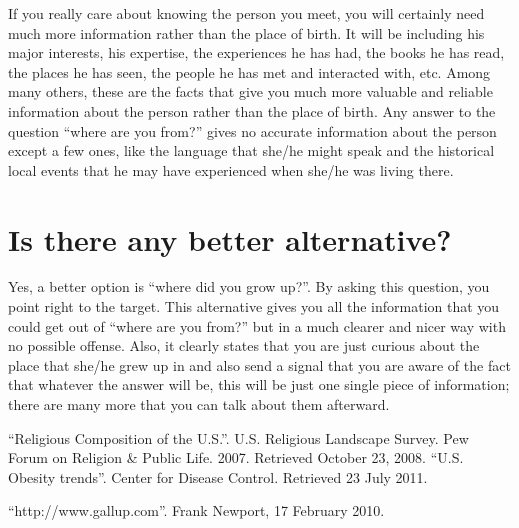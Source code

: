 \documentclass[DIV=calc, paper=a4, fontsize=11pt, twocolumn]{scrartcl}	 %
\begin{document}
If you really care about knowing the person you meet, you will certainly need much more information rather than the place of birth. It will be including his major interests, his expertise, the experiences he has had, the books he has read, the places he has seen, the people he has met and interacted with, etc. Among many others, these are the facts that give you much more valuable and reliable information about the person rather than the place of birth. Any answer to the question ``where are you from?'' gives no accurate information about the person except a few ones, like the language that she/he might speak and the historical local events that he may have experienced when she/he was living there. 



\section*{Is there any better alternative?}
Yes, a better option is ``where did you grow up?''. By asking this question, you point right to the target. This alternative gives you all the information that you could get out of ``where are you from?'' but in a much clearer and nicer way with no possible offense. Also, it clearly states that you are just curious about the place that she/he grew up in and also send a signal that you are aware of the fact that whatever the answer will be, this will be just one single piece of information; there are many more that you can talk about them afterward. 


\begin{thebibliography}{99} %

 ``Religious Composition of the U.S.''. U.S. Religious Landscape Survey. Pew Forum on Religion \& Public Life. 2007. Retrieved October 23, 2008.
 ``U.S. Obesity trends''. Center for Disease Control. Retrieved 23 July 2011.

 ``http://www.gallup.com''. Frank Newport, 17 February 2010.
 
\end{thebibliography}

\end{document}
